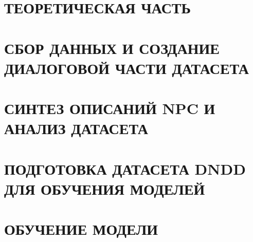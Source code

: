 \documentclass{disser}
\begin{document}

\tableofcontents
\thispagestyle{empty}


\chapter{ТЕОРЕТИЧЕСКАЯ ЧАСТЬ}


\chapter{СБОР ДАННЫХ И СОЗДАНИЕ ДИАЛОГОВОЙ ЧАСТИ ДАТАСЕТА}


\chapter{СИНТЕЗ ОПИСАНИЙ NPC И АНАЛИЗ ДАТАСЕТА}


\chapter{ПОДГОТОВКА ДАТАСЕТА DNDD ДЛЯ ОБУЧЕНИЯ МОДЕЛЕЙ}


\chapter{ОБУЧЕНИЕ МОДЕЛИ}



\break



\appendix

\end{document}
